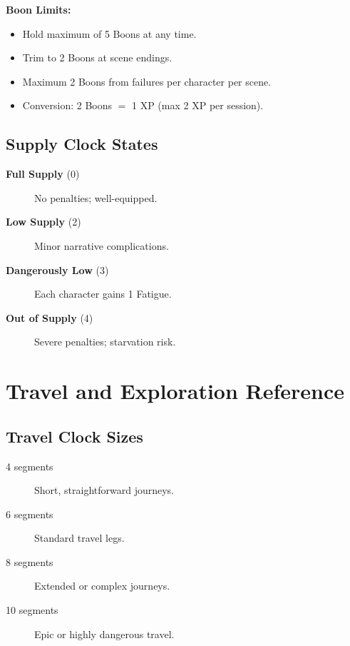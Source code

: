 \textbf{Boon Limits:}
\begin{itemize}
\item Hold maximum of 5 Boons at any time.
\item Trim to 2 Boons at scene endings.
\item Maximum 2 Boons from failures per character per scene.
\item Conversion: 2 Boons $=$ 1 XP (max 2 XP per session).
\end{itemize}

\subsection{Supply Clock States}
\label{subsec:supply-ref}

\begin{description}
\item[\textbf{Full Supply} (0)] No penalties; well-equipped.
\item[\textbf{Low Supply} (2)] Minor narrative complications.
\item[\textbf{Dangerously Low} (3)] Each character gains 1 Fatigue.
\item[\textbf{Out of Supply} (4)] Severe penalties; starvation risk.
\end{description}

\section{Travel and Exploration Reference}
\label{sec:travel-reference}

\subsection{Travel Clock Sizes}
\label{subsec:travel-clocks-ref}

\begin{description}
\item[4 segments] Short, straightforward journeys.
\item[6 segments] Standard travel legs.
\item[8 segments] Extended or complex journeys.
\item[10 segments] Epic or highly dangerous travel.
\end{description}

